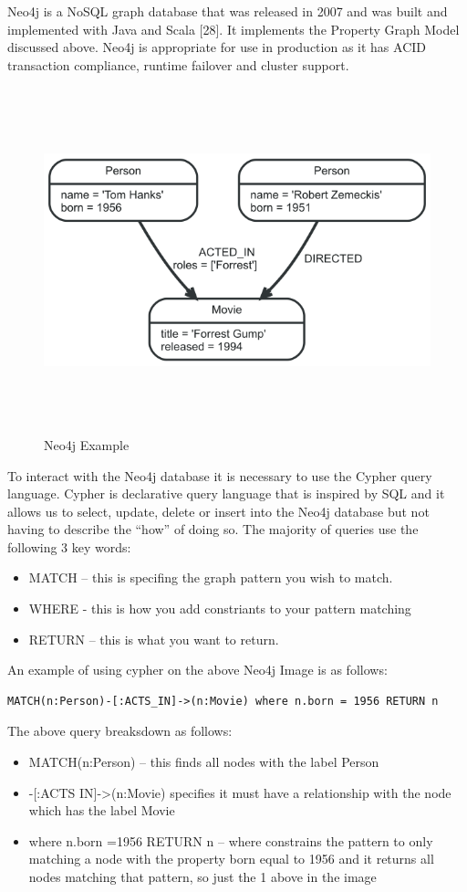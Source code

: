 Neo4j is a NoSQL graph database that was released in 2007 and was built and implemented with Java and Scala [28]. It implements the Property Graph Model discussed above. Neo4j is appropriate for use in production as it has ACID transaction compliance, runtime failover and cluster support.

\begin{figure}[h]
	\caption{Neo4j Example}
	\centering
	\includegraphics[width=15cm, height=10cm]{img/neo4j-example}
\end{figure}

To interact with the Neo4j database it is necessary to use the Cypher query language. Cypher is declarative query language that is inspired by SQL and it allows us to select, update, delete or insert into the Neo4j database but not having to describe the “how” of doing so. The majority of queries use the following 3 key words:
\begin{itemize}
	\item MATCH – this is specifing the graph pattern you wish to match.
	\item WHERE -  this is how you add constriants to your pattern matching 
	\item RETURN – this is what you want to return.
\end{itemize}
An example of using cypher on the above Neo4j Image is as follows:
\begin{verbatim}
MATCH(n:Person)-[:ACTS_IN]->(n:Movie) where n.born = 1956 RETURN n
\end{verbatim}
The above query breaksdown as follows:
\begin{itemize}
	\item MATCH(n:Person) – this finds all nodes with the label Person
	\item -[:ACTS IN]->(n:Movie) specifies it must have a relationship with the node which has the label Movie
	\item where n.born =1956 RETURN n – where constrains the pattern to only matching a node with the property born equal to 1956 and it returns all nodes matching that pattern, so just the 1 above in the image \cite{neo4j}
\end{itemize}

